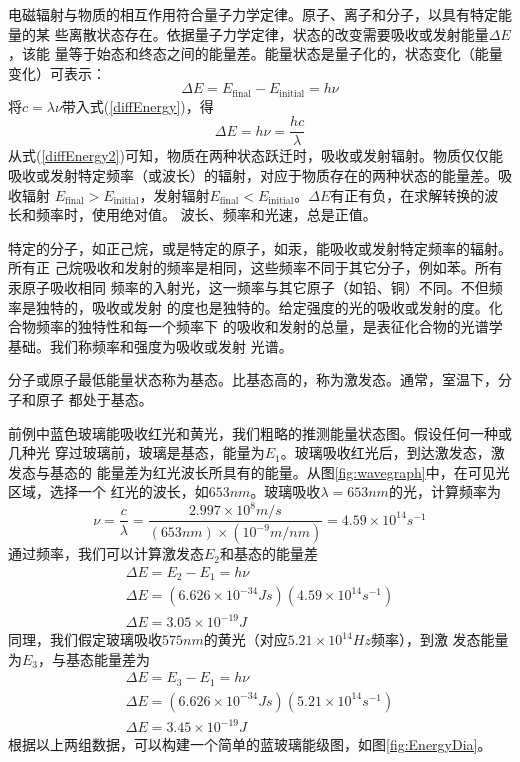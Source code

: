电磁辐射与物质的相互作用符合量子力学定律。原子、离子和分子，以具有特定能量的某
些离散状态存在。依据量子力学定律，状态的改变需要吸收或发射能量$\Delta E$，该能
量等于始态和终态之间的能量差。能量状态是量子化的，状态变化（能量变化）可表示：
\begin{equation}
    \Delta E = E_{\text{final}} - E_{\text{initial}} = h\nu
    \label{diffEnergy}
\end{equation}
将$c = \lambda\nu$带入式(\ref{diffEnergy})，得
\begin{equation}
    \Delta E = h\nu=\frac{hc}{\lambda}
    \label{diffEnergy2}
\end{equation}
从式(\ref{diffEnergy2})可知，物质在两种状态跃迁时，吸收或发射辐射。物质仅仅能
吸收或发射特定频率（或波长）的辐射，对应于物质存在的两种状态的能量差。吸收辐射
$E_{\text{final}} > E_{\text{initial}}$，发射辐射$E_{\text{final}} <
E_{\text{initial}}$。$\Delta E$有正有负，在求解转换的波长和频率时，使用绝对值。
波长、频率和光速，总是正值。

特定的分子，如正己烷，或是特定的原子，如汞，能吸收或发射特定频率的辐射。所有正
己烷吸收和发射的频率是相同，这些频率不同于其它分子，例如苯。所有汞原子吸收相同
频率的入射光，这一频率与其它原子（如铅、铜）不同。不但频率是独特的，吸收或发射
的度也是独特的。给定强度的光的吸收或发射的度。化合物频率的独特性和每一个频率下
的吸收和发射的总量，是表征化合物的光谱学基础。我们称频率和强度为吸收或发射
光谱。

分子或原子最低能量状态称为基态。比基态高的，称为激发态。通常，室温下，分子和原子
都处于基态。

前例中蓝色玻璃能吸收红光和黄光，我们粗略的推测能量状态图。假设任何一种或几种光
穿过玻璃前，玻璃是基态，能量为$E_1$。玻璃吸收红光后，到达激发态，激发态与基态的
能量差为红光波长所具有的能量。从图\ref{fig:wavegraph}中，在可见光区域，选择一个
红光的波长，如$653 nm$。玻璃吸收$\lambda = 653 nm$的光，计算频率为
\[
    \nu =\frac{c}{\lambda} = \frac{2.997\times 10^8 m/s}{(653 nm)\times
    (10^{-9} m/nm)}=4.59\times10^{14}s^{-1}
\]
通过频率，我们可以计算激发态$E_2$和基态的能量差
\[
    \begin{array}{l}
        \Delta E = E_2 - E_1 = h\nu\\
        \Delta E = (6.626 \times 10^{-34}J s)(4.59\times 10^{14}s^{-1})\\
        \Delta E = 3.05 \times 10^{-19} J
    \end{array}
\]
同理，我们假定玻璃吸收$575 nm$的黄光（对应$5.21\times 10^{14} Hz$频率），到激
发态能量为$E_3$，与基态能量差为
\[
    \begin{array}{l}
        \Delta E = E_3 - E_1 = h\nu\\
        \Delta E = (6.626 \times 10^{-34}J s)(5.21\times 10^{14}s^{-1})\\
        \Delta E = 3.45 \times 10^{-19} J
    \end{array}
\]
根据以上两组数据，可以构建一个简单的蓝玻璃能级图，如图\ref{fig:EnergyDia}。

